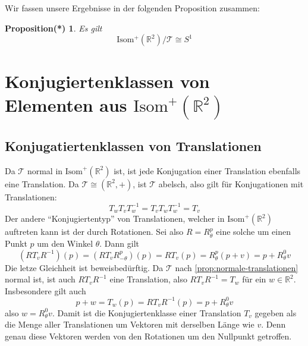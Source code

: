 \documentclass[a4paper, ngerman]{article}
\newcounter{chapter}
\numberwithin{equation}{chapter}
\theoremstyle{plain}
\newtheorem{propositionstrd}{Proposition(*)}[chapter]
\theoremstyle{definition}
\newcommand{\geradisometr}{\ensuremath{\mathrm{Isom}^+(\mathbb R^2)}}
\newcommand{\anm}[1]{{\color{red} #1}}
\begin{document}
Wir fassen unsere Ergebnisse in der folgenden Proposition zusammen: 
\begin{propositionstrd}\label{prop*:gestalt-quotient-über-translationen}
    Es gilt 
    \begin{equation*}
        \mathrm{Isom^+(\mathbb R^2)}/\mathcal T \cong S^1 
    \end{equation*}
\end{propositionstrd}

%

\section{Konjugiertenklassen von Elementen aus \(\geradisometr\)}\label{sec:konjugiertenklassen-gerader-isometrien}

\subsection{Konjugatiertenklassen von Translationen}\label{subsec:konjugiertenklassen-von-translationen}
Da \(\mathcal T\) normal in \(\geradisometr\) ist, ist jede Konjugation einer Translation ebenfalls eine Translation. Da \(\mathcal T \cong (\mathbb R^2, +)\), ist \(\mathcal T\) abelsch, also gilt für Konjugationen mit Translationen: 
\begin{equation*}
    T_w T_v T_w^{-1} = T_v T_w T_w^{-1} = T_v
\end{equation*}
Der andere "`Konjugiertentyp"' von Translationen, welcher in \(\geradisometr\) auftreten kann ist der durch Rotationen. Sei also \(R = R_\theta^p\) eine solche um einen Punkt \(p\) um den Winkel \(\theta\). Dann gilt 
\begin{equation*}
    (RT_vR^{-1})(p) = (RT_vR_{-\theta}^p)(p) = RT_v(p) = R_\theta^p (p+v) = p + R_\theta^0 v
\end{equation*}
\anm{Die letze Gleichheit ist beweisbedürftig.} Da \(\mathcal T\) nach \cref{prop:normale-translationen} normal ist, ist auch \(RT_vR^{-1}\) eine Translation, also \(RT_vR^{-1} = T_w\) für ein \(w \in \mathbb R^2\). Insbesondere gilt auch 
\begin{equation*}
    p + w = T_w(p) = RT_vR^{-1}(p) = p + R_\theta^0 v
\end{equation*}
also \(w = R_\theta^0 v\). Damit ist die Konjugiertenklasse einer Translation \(T_v\) gegeben als die Menge aller Translationen um Vektoren mit derselben Länge wie \(v\). Denn genau diese Vektoren werden von den Rotationen um den Nullpunkt getroffen. 
\end{document}
